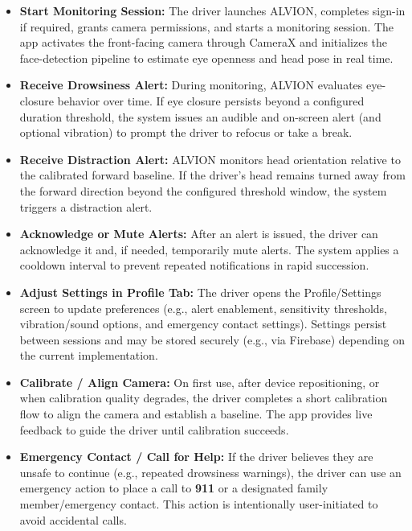 \documentclass[11pt]{report}
\begin{document}
\begin{itemize}

    \item \textbf{Start Monitoring Session:}
    The driver launches ALVION, completes sign-in if required, grants camera permissions, and starts a monitoring session. The app activates the front-facing camera through CameraX and initializes the face-detection pipeline to estimate eye openness and head pose in real time.

    \item \textbf{Receive Drowsiness Alert:}
    During monitoring, ALVION evaluates eye-closure behavior over time. If eye closure persists beyond a configured duration threshold, the system issues an audible and on-screen alert (and optional vibration) to prompt the driver to refocus or take a break.

    \item \textbf{Receive Distraction Alert:}
    ALVION monitors head orientation relative to the calibrated forward baseline. If the driver’s head remains turned away from the forward direction beyond the configured threshold window, the system triggers a distraction alert.

    \item \textbf{Acknowledge or Mute Alerts:}
    After an alert is issued, the driver can acknowledge it and, if needed, temporarily mute alerts. The system applies a cooldown interval to prevent repeated notifications in rapid succession.

    \item \textbf{Adjust Settings in Profile Tab:}
    The driver opens the Profile/Settings screen to update preferences (e.g., alert enablement, sensitivity thresholds, vibration/sound options, and emergency contact settings). Settings persist between sessions and may be stored securely (e.g., via Firebase) depending on the current implementation.

    \item \textbf{Calibrate / Align Camera:}
    On first use, after device repositioning, or when calibration quality degrades, the driver completes a short calibration flow to align the camera and establish a baseline. The app provides live feedback to guide the driver until calibration succeeds.

    \item \textbf{Emergency Contact / Call for Help:}
    If the driver believes they are unsafe to continue (e.g., repeated drowsiness warnings), the driver can use an emergency action to place a call to \textbf{911} or a designated family member/emergency contact. This action is intentionally user-initiated to avoid accidental calls.


\end{itemize}
\end{document}
